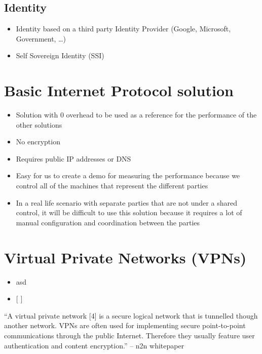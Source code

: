\hypertarget{identity}{%
\subsection{Identity}\label{identity}}

\begin{itemize}
\tightlist
\item
  Identity based on a third party Identity Provider (Google, Microsoft,
  Government, \ldots)
\item
  Self Sovereign Identity (SSI)
\end{itemize}

\hypertarget{basic-internet-protocol-solution}{%
\section{Basic Internet Protocol
solution}\label{basic-internet-protocol-solution}}

\begin{itemize}
\tightlist
\item
  Solution with 0 overhead to be used as a reference for the performance
  of the other solutions
\item
  No encryption
\item
  Requires public IP addresses or DNS
\item
  Easy for us to create a demo for measuring the performance because we
  control all of the machines that represent the different parties
\item
  In a real life scenario with separate parties that are not under a
  shared control, it will be difficult to use this solution because it
  requires a lot of manual configuration and coordination between the
  parties
\end{itemize}

\hypertarget{virtual-private-networks-vpns}{%
\section{Virtual Private Networks
(VPNs)}\label{virtual-private-networks-vpns}}

\begin{itemize}
\item
  asd
\item
  {[} {]}
\end{itemize}

``A virtual private network {[}4{]} is a secure logical network that is
tunnelled though another network. VPNs are often used for implementing
secure point-to-point communications through the public Internet.
Therefore they usually feature user authentication and content
encryption.'' -- n2n whitepaper

